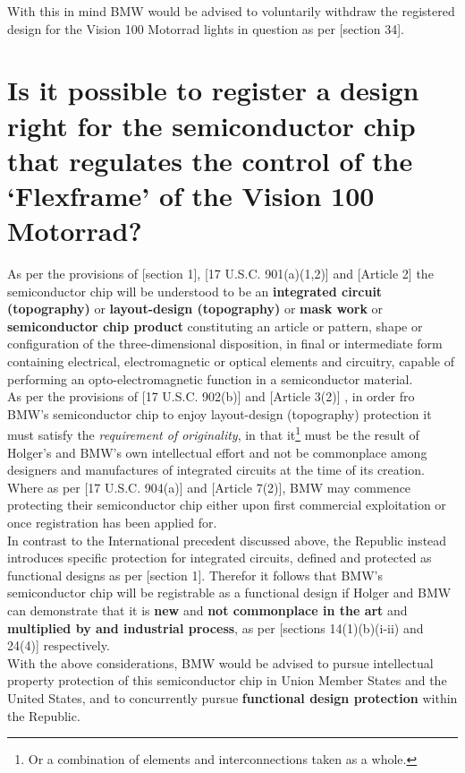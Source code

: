 \documentclass[11pt]{article}
\begin{document}
With this in mind BMW would be advised to voluntarily withdraw the registered
design for the Vision 100 Motorrad lights in question as per [section
34]\cite{rsa93_designs_act}.

\section{Is it possible to register a design right for the semiconductor chip that regulates the control of the `Flexframe' of the Vision 100 Motorrad?}
\label{sec:orgdcfe88f}

As per the provisions of [section 1]\cite{rsa93_designs_act}, [17 U.S.C.
901(a)(1,2)]\cite{usa47_title17_ch9} and [Article 2]\cite{wipo89_washington_treaty_ip_ic}
the semiconductor chip will be understood to be an \textbf{integrated circuit
(topography)} or \textbf{layout-design (topography)} or \textbf{mask work} or \textbf{semiconductor
chip product} constituting an article or pattern, shape or configuration of the
three-dimensional disposition, in final or intermediate form containing
electrical, electromagnetic or optical elements and circuitry, capable of
performing an opto-electromagnetic function in a semiconductor material.\\

As per the provisions of [17 U.S.C. 902(b)]\cite{usa47_title17_ch9} and [Article
3(2)]\cite{wipo89_washington_treaty_ip_ic} , in order fro BMW's semiconductor chip
to enjoy layout-design (topography) protection it must satisfy the \emph{requirement
of originality}, in that it\footnote{Or a combination of elements and
interconnections taken as a whole.} must be the result of Holger's and BMW's own
intellectual effort and not be commonplace among designers and manufactures of
integrated circuits at the time of its creation. Where as per [17 U.S.C.
904(a)]\cite{usa47_title17_ch9} and [Article
7(2)]\cite{wipo89_washington_treaty_ip_ic}, BMW may commence protecting their
semiconductor chip either upon first commercial exploitation or once
registration has been applied for.\\

In contrast to the International precedent discussed above, the Republic instead
introduces specific protection for integrated circuits, defined and protected as
functional designs as per [section 1]\cite{rsa93_designs_act}. Therefor it follows
that BMW's semiconductor chip will be registrable as a functional design if
Holger and BMW can demonstrate that it is \textbf{new} and \textbf{not commonplace in the art}
and \textbf{multiplied by and industrial process}, as per [sections 14(1)(b)(i-ii) and
24(4)]\cite{rsa93_designs_act} respectively.\\

With the above considerations, BMW would be advised to pursue intellectual
property protection of this semiconductor chip in Union Member States and the
United States, and to concurrently pursue \textbf{functional design protection} within
the Republic.

\printbibliography
\end{document}
